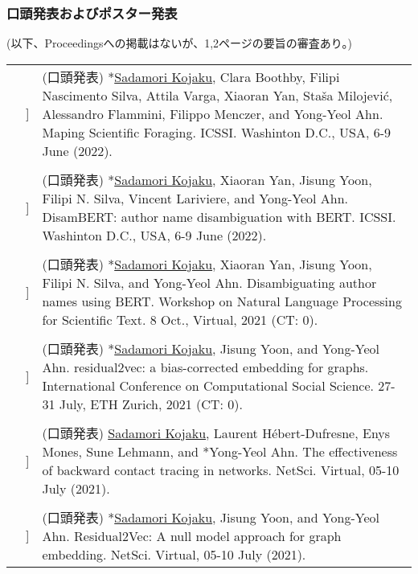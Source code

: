 \documentclass[letterpaper, 11pt]{article}
\newcounter{papercount}
\newcounter{papertype}
\newcommand{\paperitem}{%
\stepcounter{papercount}%
{\color{OliveGreen}{[\arabic{papertype}.\thepapercount}]}
}
\begin{document}
\subsubsection*{口頭発表およびポスター発表}
(以下、Proceedingsへの掲載はないが、1,2ページの要旨の審査あり。)
\begin{longtable}{p{0in}p{2em}p{5.5in}}
    &\paperitem & (口頭発表) *\underline{Sadamori Kojaku}, Clara Boothby, Filipi Nascimento Silva, Attila Varga, Xiaoran Yan, Sta\v{s}a Milojevi\'{c}, Alessandro Flammini, Filippo Menczer, and Yong-Yeol Ahn.
    Maping Scientific Foraging. ICSSI. Washinton D.C., USA, 6-9 June (2022).\\
    & & \\
    &\paperitem & (口頭発表) *\underline{Sadamori Kojaku}, Xiaoran Yan, Jisung Yoon, Filipi N. Silva, Vincent Lariviere, and Yong-Yeol Ahn.
    DisamBERT: author name disambiguation with BERT. ICSSI. Washinton D.C., USA, 6-9 June (2022).\\
    & & \\
    &\paperitem &  (口頭発表) *\underline{Sadamori Kojaku}, Xiaoran Yan, Jisung Yoon, Filipi N. Silva, and Yong-Yeol Ahn.
    Disambiguating author names using BERT. Workshop on Natural Language Processing for Scientific Text. 8 Oct., Virtual, 2021 (CT: 0).\\
    & & \\
    &\paperitem &  (口頭発表) *\underline{Sadamori Kojaku}, Jisung Yoon, and Yong-Yeol Ahn.
    residual2vec: a bias-corrected embedding for graphs. International Conference on Computational Social Science. 27-31 July, ETH Zurich, 2021 (CT: 0).\\
    & & \\
    &\paperitem & (口頭発表) \underline{Sadamori Kojaku}, Laurent H\'ebert-Dufresne, Enys Mones, Sune Lehmann, and *Yong-Yeol Ahn.
    The effectiveness of backward contact tracing in networks. NetSci. Virtual, 05-10 July (2021).\\
    & & \\
    &\paperitem &  (口頭発表) *\underline{Sadamori Kojaku}, Jisung Yoon, and Yong-Yeol Ahn.
    Residual2Vec: A null model approach for graph embedding. NetSci. Virtual, 05-10 July (2021).\\

\end{longtable}
\end{document}
